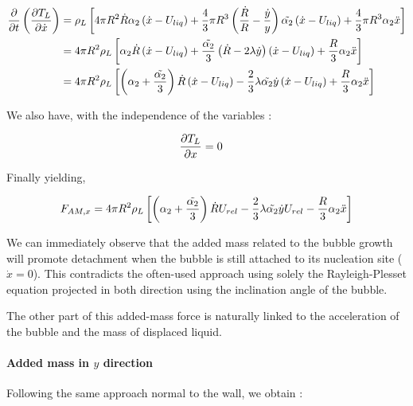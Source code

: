 \begin{align}
\frac{\partial }{\partial t}\left(  \frac{\partial T_{L}}{\partial \dot{x}} \right)&=\rho_{L}\left[  4\pi R^{2} \dot{R} \alpha_{2}\left( \dot{x}-U_{liq} \right)+\frac{4}{3}\pi R^{3}\left(  \frac{\dot{R}}{R} - \frac{\dot{y}}{y}  \right)\tilde{\alpha_{2}}\left( \dot{x}-U_{liq} \right)+\frac{4}{3}\pi R^{3}\alpha_{2} \ddot{x}  \right] \\
&=4\pi R^{2} \rho_{L}\left[  \alpha_{2}\dot{R}\left( \dot{x}-U_{liq} \right)+\frac{\tilde{\alpha_{2}}}{3}\left( \dot{R}- 2\lambda \dot{y}  \right)\left( \dot{x}-U_{liq} \right) + \frac{R}{3}\alpha_{2}\ddot{x}  \right]\\
&=4 \pi R^{2} \rho_{L}\left[ \left( \alpha_{2}+\frac{\tilde{\alpha_{2}}}{3} \right)\dot{R}\left( \dot{x}-U_{liq} \right)-\frac{2}{3}\lambda \tilde{\alpha_{2}}\dot{y}\left( \dot{x}-U_{liq} \right)+\frac{R}{3}\alpha_{2}\ddot{x}  \right]
\end{align}

We also have, with the independence of the variables :

\begin{align}
\frac{\partial T_{L}}{\partial x}&=0
\end{align}


Finally yielding, 

\begin{align}
F_{AM,x}=4\pi R^{2}\rho_{L} \left[ \left( \alpha_{2}+\frac{\tilde{\alpha_{2}}}{3} \right)\dot{R}U_{rel}-\frac{2}{3}\lambda \tilde{\alpha_{2}}\dot{y}U_{rel}-\frac{R}{3}\alpha_{2}\ddot{x}  \right]
\end{align}

We can immediately observe that the added mass related to the bubble growth will promote detachment when the bubble is still attached to its nucleation site ($\dot{x}=0$). This contradicts the often-used approach using solely the Rayleigh-Plesset equation projected in both direction using the inclination angle of the bubble. 

The other part of this added-mass force is naturally linked to the acceleration of the bubble and the mass of displaced liquid. 


\paragraph{Added mass in $y$ direction}

Following the same approach normal to the wall, we obtain : 

